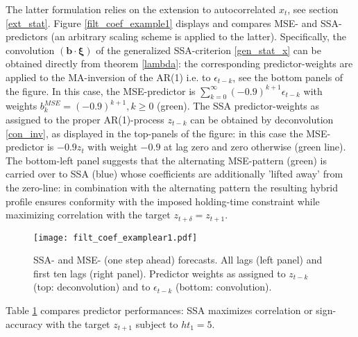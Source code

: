 \documentclass[a4paper]{article}
\begin{document}
The latter formulation relies on the extension to autocorrelated $x_t$, see section \ref{ext_stat}. Figure \ref{filt_coef_example1} displays and compares MSE- and SSA-predictors (an arbitrary scaling scheme is applied to the latter). Specifically, the convolution $(\mathbf{b}\cdot\boldsymbol{\xi})$ of the generalized SSA-criterion \ref{gen_stat_x} can be obtained directly from theorem \ref{lambda}: the corresponding predictor-weights are applied to the MA-inversion of the AR(1) i.e. to $\epsilon_{t-k}$, see the bottom panels of the figure. In this case, the MSE-predictor is $\sum_{k=0}^{\infty}(-0.9)^{k+1}\epsilon_{t-k}$ with weights $b_k^{MSE}=(-0.9)^{k+1}, k\geq 0$ (green). The SSA predictor-weights as assigned to the proper AR(1)-process $z_{t-k}$ can be obtained by deconvolution \ref{con_inv}, as displayed in the top-panels of the figure: in this case the MSE-predictor is $-0.9z_{t}$ with weight $-0.9$ at lag zero and zero otherwise (green line). The bottom-left panel suggests that the alternating MSE-pattern (green) is carried over to SSA (blue) whose coefficients are additionally 'lifted away' from the zero-line: in combination with the alternating pattern the resulting hybrid profile ensures conformity with the imposed holding-time constraint while maximizing correlation with the target $z_{t+\delta}=z_{t+1}$. %
\begin{figure}[H]\begin{center}\texttt{[image: filt\_coef\_examplear1.pdf]}\caption{SSA- and MSE- (one step ahead) forecasts. All lags (left panel) and first ten lags (right panel). Predictor weights as assigned to  $z_{t-k}$ (top: deconvolution) and to $\epsilon_{t-k}$ (bottom: convolution).\label{filt_coef_examplear1}}\end{center}\end{figure}Table \ref{filt_coef_examplear1} compares predictor performances: SSA maximizes correlation or sign-accuracy with the target $z_{t+1}$ subject to $ht_1=5$. %
\end{document}
